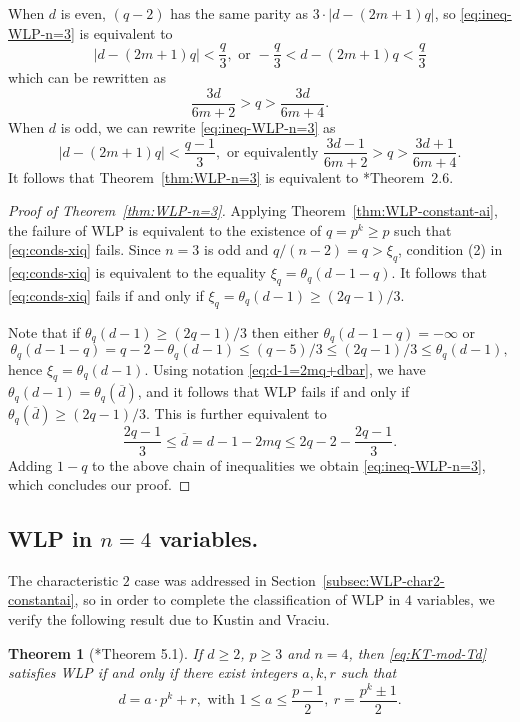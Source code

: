 \documentclass[11pt,reqno]{amsart}
\newcommand{\ol}[1]{\overline{#1}}
\newtheorem{theorem}{Theorem}[section]
\theoremstyle{definition}
\theoremstyle{remark}
\numberwithin{equation}{section}
\begin{document}
When $d$ is even, $(q-2)$ has the same parity as $3\cdot|d-(2m+1)q|$, so \eqref{eq:ineq-WLP-n=3} is equivalent to
\[ |d-(2m+1)q|<\frac{q}{3},\text{ or }-\frac{q}{3}<d-(2m+1)q<\frac{q}{3}\]
which can be rewritten as
\[ \frac{3d}{6m+2}>q>\frac{3d}{6m+4}.\]
When $d$ is odd, we can rewrite \eqref{eq:ineq-WLP-n=3} as
\[ |d-(2m+1)q|<\frac{q-1}{3},\text{ or equivalently }\frac{3d-1}{6m+2}>q>\frac{3d+1}{6m+4}.\]
It follows that Theorem~\ref{thm:WLP-n=3} is equivalent to \cite{bre-kai}*{Theorem~2.6}.

\begin{proof}[Proof of Theorem~\ref{thm:WLP-n=3}]
    Applying Theorem~\ref{thm:WLP-constant-ai}, the failure of WLP is equivalent to the existence of $q=p^k\geq p$ such that \eqref{eq:conds-xiq} fails. Since $n=3$ is odd and $q/(n-2)=q>\xi_q$, condition (2) in \eqref{eq:conds-xiq} is equivalent to the equality $\xi_q=\theta_q(d-1-q)$. It follows that \eqref{eq:conds-xiq} fails if and only if $\xi_q=\theta_q(d-1)\geq(2q-1)/3$. 

    Note that if $\theta_q(d-1)\geq(2q-1)/3$ then either $\theta_q(d-1-q)=-\infty$ or 
    \[\theta_q(d-1-q)=q-2-\theta_q(d-1)\leq(q-5)/3\leq(2q-1)/3\leq\theta_q(d-1),\] 
    hence $\xi_q=\theta_q(d-1)$. Using notation \eqref{eq:d-1=2mq+dbar}, we have $\theta_q(d-1) = \theta_q(\ol{d})$, and it follows that WLP fails if and only if $\theta_q(\ol{d})\geq(2q-1)/3$. This is further equivalent to
    \[ \frac{2q-1}{3}\leq \ol{d}=d-1-2mq \leq 2q-2-\frac{2q-1}{3}.\]
    Adding $1-q$ to the above chain of inequalities we obtain \eqref{eq:ineq-WLP-n=3}, which concludes our proof.
\end{proof}

\subsection{WLP in $n=4$ variables.} The characteristic $2$ case was addressed in Section~\ref{subsec:WLP-char2-constantai}, so in order to complete the classification of WLP in $4$ variables, we verify the following result due to Kustin and Vraciu.

\begin{theorem}[\cite{kus-vra}*{Theorem 5.1}]
 If $d\geq 2$, $p\geq 3$ and $n=4$, then \eqref{eq:KT-mod-Td} satisfies WLP if and only if there exist integers $a,k,r$ such that
 \[d = a\cdot p^k+r,\text{ with }1\leq a\leq\frac{p-1}{2},\ r=\frac{p^k\pm 1}{2}.\]
\end{theorem}
\end{document}
